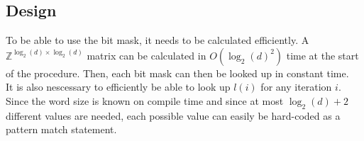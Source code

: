 \subsection{Design}
To be able to use the bit mask, it needs to be calculated efficiently. A $\mathbb{Z}^{\log_2(d) \times \log_2(d)}$ matrix can be calculated in $O(\log_2(d)^2)$ time at the start of the procedure. Then, each bit mask can then be looked up in constant time.\\
It is also nescessary to efficiently be able to look up $l(i)$ for any iteration $i$.
Since the word size is known on compile time and since at most $\log_2(d)+2$ different values are needed, each possible value can easily be hard-coded as a pattern match statement.

